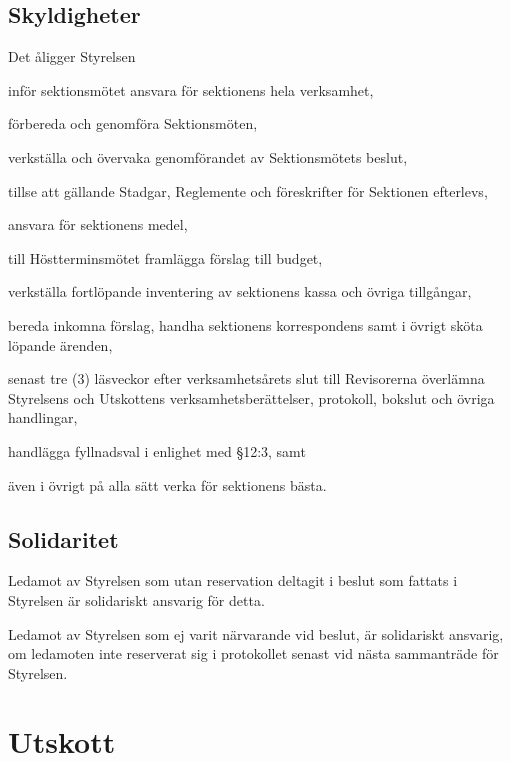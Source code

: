 \documentclass[10pt]{article}
\begin{document}
\subsection{Skyldigheter}
Det åligger Styrelsen
\begin{attlist}
\item inför sektionsmötet ansvara för sektionens hela verksamhet,
\item förbereda och genomföra Sektionsmöten,
\item verkställa och övervaka genomförandet av Sektionsmötets beslut,
\item tillse att gällande Stadgar, Reglemente och föreskrifter för
    Sektionen efterlevs,
\item ansvara för sektionens medel,
\item till Höstterminsmötet framlägga förslag till budget,
\item verkställa fortlöpande inventering av sektionens kassa och övriga
    tillgångar,
\item bereda inkomna förslag, handha sektionens korrespondens samt i övrigt
    sköta löpande ärenden,
\item senast tre (3) läsveckor efter verksamhetsårets slut till Revisorerna
    överlämna Styrelsens och Utskottens verksamhetsberättelser, protokoll,
    bokslut och övriga handlingar,
\item handlägga fyllnadsval i enlighet med §12:3, samt
\item även i övrigt på alla sätt verka för sektionens bästa.
\end{attlist}


\subsection{Solidaritet}
Ledamot av Styrelsen som utan reservation deltagit i beslut som fattats i
Styrelsen är solidariskt ansvarig för detta.

Ledamot av Styrelsen som ej varit närvarande vid beslut, är solidariskt
ansvarig, om ledamoten inte reserverat sig i protokollet senast vid nästa
sammanträde för Styrelsen.
\newpage

\section{Utskott}
\end{document}
